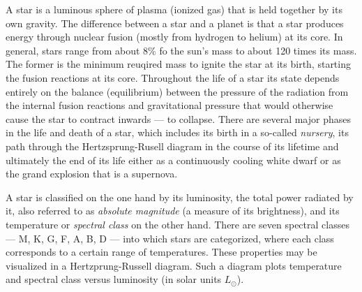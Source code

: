 
A star is a luminous sphere of plasma (ionized gas) that is held together by its own gravity. The difference between a star and a planet is that a star produces energy through nuclear fusion (mostly from hydrogen to helium) at its core. In general, stars range from about 8\% fo the sun's mass to about 120 times its mass. The former is the minimum reuqired mass to ignite the star at its birth, starting the fusion reactions at its core. Throughout the life of a star its state depends entirely on the balance (equilibrium) between the pressure of the radiation from the internal fusion reactions and gravitational pressure that would otherwise cause the star to contract inwards --- to collapse. There are several major phases in the life and death of a star, which includes its birth in a so-called \emph{nursery}, its path through the Hertzsprung-Rusell diagram in the course of its lifetime and ultimately the end of its life either as a continuously cooling white dwarf or as the grand explosion that is a supernova.


A star is classified on the one hand by its luminosity, the total power radiated by it, also referred to as \emph{absolute magnitude} (a measure of its brightness), and its temperature or \emph{spectral class} on the other hand. There are seven spectral classes --- M, K, G, F, A, B, D --- into which stars are categorized, where each class corresponds to a certain range of temperatures. These properties may be visualized in a Hertzprung-Russell diagram. Such a diagram plots temperature and spectral class versus luminosity (in solar units $L_{\odot}$).

